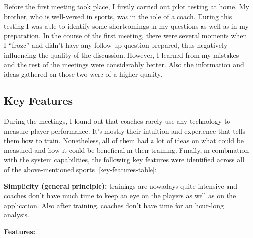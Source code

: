Before the first meeting took place, I firstly carried out pilot testing at home. My brother, who is well-versed in sports, was in the role of a coach. During this testing I was able to identify some shortcomings in my questions as well as in my preparation. In the course of the first meeting, there were several moments when I “froze” and didn’t have any follow-up question prepared, thus negatively influencing the quality of the discussion. However, I learned from my mistakes and the rest of the meetings were considerably better. Also the information and ideas gathered on those two were of a higher quality.

\subsection{Key Features}\label{key-features}
During the meetings, I found out that coaches rarely use any technology to measure player performance. It’s mostly their intuition and experience that tells them how to train. Nonetheless, all of them had a lot of ideas on what could be measured and how it could be beneficial in their training. Finally, in combination with the system capabilities, the following key features were identified across all of the above-mentioned sports~\ref{key-features-table}:

\bigbreak
\textbf{Simplicity (general principle):}
trainings are nowadays quite intensive and coaches don’t have much time to keep an eye on the players as well as on the application. Also after training, coaches don’t have time for an hour-long analysis.

\bigbreak

\textbf{Features:}
\begin{table}[H]
\centering
{}
\caption{Key features}
\label{key-features-table}
\end{table}

